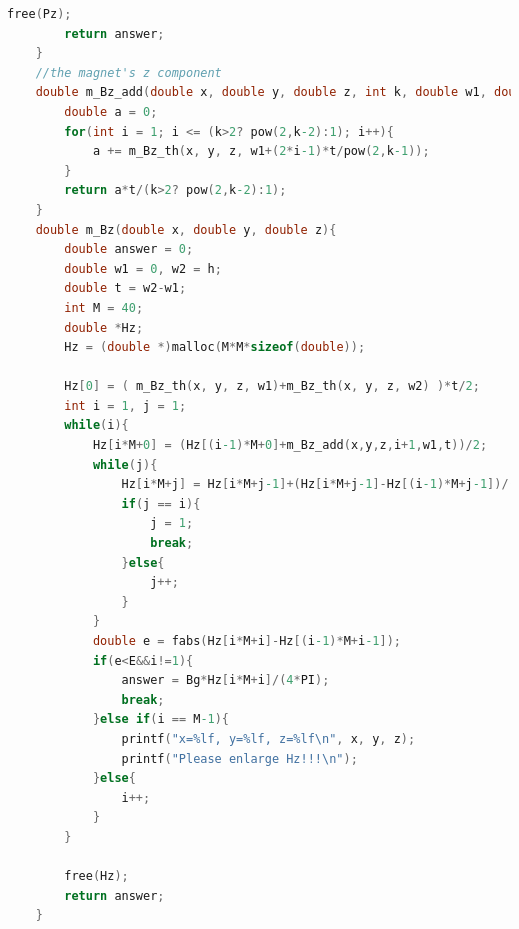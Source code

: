\documentclass[AutoFakeBold]{LZUThesis}
\begin{document}
\begin{lstlisting}[language = C]
        free(Pz);
        return answer;
    }
    //the magnet's z component
    double m_Bz_add(double x, double y, double z, int k, double w1, double t){
        double a = 0;
        for(int i = 1; i <= (k>2? pow(2,k-2):1); i++){
            a += m_Bz_th(x, y, z, w1+(2*i-1)*t/pow(2,k-1));
        }
        return a*t/(k>2? pow(2,k-2):1);
    }
    double m_Bz(double x, double y, double z){
        double answer = 0;
        double w1 = 0, w2 = h;
        double t = w2-w1;
        int M = 40;
        double *Hz;
        Hz = (double *)malloc(M*M*sizeof(double));
    
        Hz[0] = ( m_Bz_th(x, y, z, w1)+m_Bz_th(x, y, z, w2) )*t/2;
        int i = 1, j = 1;
        while(i){
            Hz[i*M+0] = (Hz[(i-1)*M+0]+m_Bz_add(x,y,z,i+1,w1,t))/2;
            while(j){
                Hz[i*M+j] = Hz[i*M+j-1]+(Hz[i*M+j-1]-Hz[(i-1)*M+j-1])/(pow(4,j)-1);
                if(j == i){
                    j = 1;
                    break;
                }else{
                    j++;
                }
            }
            double e = fabs(Hz[i*M+i]-Hz[(i-1)*M+i-1]);
            if(e<E&&i!=1){
                answer = Bg*Hz[i*M+i]/(4*PI);
                break;
            }else if(i == M-1){
                printf("x=%lf, y=%lf, z=%lf\n", x, y, z);
                printf("Please enlarge Hz!!!\n");
            }else{
                i++;
            }
        }
    
        free(Hz);
        return answer;
    }
    

\end{lstlisting}
\end{document}
